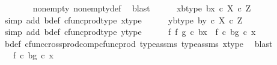 \begin{isabellebody}
\ \ \ \ \ \ \isamarkupfalse%
\ nonempty{\isacharparenleft}{\kern0pt}{}{\isacharparenright}{\kern0pt}\ nonempty{\isacharunderscore}{\kern0pt}def\ \isamarkupfalse%
\ blast\isanewline
\ \ \ \ \isamarkupfalse%
\ xb{\isacharunderscore}{\kern0pt}type{\isacharcolon}{\kern0pt}\ {\isachardoublequoteopen}{\isasymlangle}b{\isacharcomma}{\kern0pt}x{\isasymrangle}\ {\isasymin}\isactrlsub c\ X\ {\isasymtimes}\isactrlsub c\ Z{\isachardoublequoteclose}\isanewline
\ \ \ \ \ \ \isamarkupfalse%
\ {\isacharparenleft}{\kern0pt}simp\ add{\isacharcolon}{\kern0pt}\ b{\isacharunderscore}{\kern0pt}def\ cfunc{\isacharunderscore}{\kern0pt}prod{\isacharunderscore}{\kern0pt}type\ x{\isacharunderscore}{\kern0pt}type{}{\isacharparenright}{\kern0pt}\isanewline
\ \ \ \ \isamarkupfalse%
\ yb{\isacharunderscore}{\kern0pt}type{\isacharcolon}{\kern0pt}\ {\isachardoublequoteopen}{\isasymlangle}b{\isacharcomma}{\kern0pt}y{\isasymrangle}\ {\isasymin}\isactrlsub c\ X\ {\isasymtimes}\isactrlsub c\ Z{\isachardoublequoteclose}\isanewline
\ \ \ \ \ \ \isamarkupfalse%
\ {\isacharparenleft}{\kern0pt}simp\ add{\isacharcolon}{\kern0pt}\ b{\isacharunderscore}{\kern0pt}def\ cfunc{\isacharunderscore}{\kern0pt}prod{\isacharunderscore}{\kern0pt}type\ y{\isacharunderscore}{\kern0pt}type{}{\isacharparenright}{\kern0pt}\isanewline
\ \ \ \ \isamarkupfalse%
\ {\isachardoublequoteopen}{\isacharparenleft}{\kern0pt}f\ {\isasymtimes}\isactrlsub f\ g{\isacharparenright}{\kern0pt}\ {\isasymcirc}\isactrlsub c\ {\isasymlangle}b{\isacharcomma}{\kern0pt}x{\isasymrangle}\ {\isacharequal}{\kern0pt}\ {\isasymlangle}f\ {\isasymcirc}\isactrlsub c\ b{\isacharcomma}{\kern0pt}g\ {\isasymcirc}\isactrlsub c\ x{\isasymrangle}{\isachardoublequoteclose}\isanewline
\ \ \ \ \ \ \isamarkupfalse%
\ b{\isacharunderscore}{\kern0pt}def\ cfunc{\isacharunderscore}{\kern0pt}cross{\isacharunderscore}{\kern0pt}prod{\isacharunderscore}{\kern0pt}comp{\isacharunderscore}{\kern0pt}cfunc{\isacharunderscore}{\kern0pt}prod\ type{\isacharunderscore}{\kern0pt}assms{\isacharparenleft}{\kern0pt}{}{\isacharparenright}{\kern0pt}\ type{\isacharunderscore}{\kern0pt}assms{\isacharparenleft}{\kern0pt}{}{\isacharparenright}{\kern0pt}\ x{\isacharunderscore}{\kern0pt}type{}\ \isamarkupfalse%
\ blast\isanewline
\ \ \ \ \isamarkupfalse%
\ \isamarkupfalse%
\ {\isachardoublequoteopen}{\isachardot}{\kern0pt}{\isachardot}{\kern0pt}{\isachardot}{\kern0pt}\ {\isacharequal}{\kern0pt}\ {\isasymlangle}f\ {\isasymcirc}\isactrlsub c\ b{\isacharcomma}{\kern0pt}g\ {\isasymcirc}\isactrlsub c\ x{\isasymrangle}{\isachardoublequoteclose}\isanewline

\end{isabellebody}
